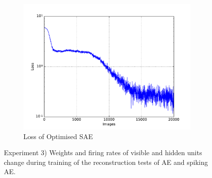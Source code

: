 \begin{figure}
\begin{subfigure}[t]{0.32\textwidth}
		\includegraphics[width=\textwidth]{pics_sdlm/07_exp_SAE_all_long/exp3_mse_nons_2.pdf}
		\caption{Loss of Optimised SAE}
	\end{subfigure}
	\caption{Experiment 3) Weights and firing rates of visible and hidden units change during training of the reconstruction tests of AE and spiking AE.}
\end{figure}

